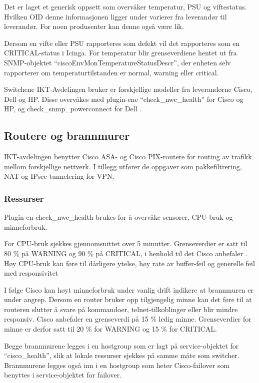 Det er laget et generisk oppsett som overvåker temperatur, PSU og viftestatus. Hvilken OID denne informasjonen ligger under varierer fra leverandør til leverandør. For noen produsenter kan denne også være lik. 

Dersom en vifte eller PSU rapporteres som defekt vil det rapporteres som en CRITICAL-status i Icinga. For temperatur blir grenseverdiene hentet ut fra SNMP-objektet ``ciscoEnvMonTemperatureStatusDescr'', der enheten selv rapporterer om temperaturtilstanden er normal, warning eller critical\cite{cisco_env_mib}.

Switchene IKT-Avdelingen bruker er forskjellige modeller fra leverandørne Cisco, Dell og HP. Disse overvåkes med plugin-ene ``check\_nwc\_health'' \cite{checknwc} for Cisco og HP, og check\_snmp\_powerconnect for Dell \cite{checkpowerconnect}.

\subsection{Routere og brannmurer}
IKT-avdelingen benytter Cisco ASA- og Cisco PIX-routere for routing av trafikk mellom forskjellige nettverk. I tillegg utfører de oppgaver som pakkefiltrering, NAT og IPsec-tunnelering for VPN.

\subsubsection{Ressurser}
Plugin-en check\_nwc\_health brukes for å overvåke sensorer, CPU-bruk og minneforbruk.

For CPU-bruk sjekkes gjennomsnittet over 5 minutter. Grenseverdier er satt til 80 \% på WARNING og 90 \% på CRITICAL, i henhold til det Cisco anbefaler \cite{ciscounifiedcommunication}. Høy CPU-bruk kan føre til dårligere ytelse, høy rate av buffer-feil og generelle feil med responsivitet \cite{ciscocpurouters}

I følge Cisco kan høyt minneforbruk under vanlig drift indikere at brannmuren er under angrep\cite{ciscomem}. Dersom en router bruker opp tilgjengelig minne kan det føre til at routeren slutter å svare på kommandoer, telnet-tilkoblinger eller blir mindre responsiv\cite{ciscomemproblem}. Cisco anbefaler en grenseverdi på 15 \% ledig minne\cite{ciscounifiedcommunication}. Grenseverdier for minne er derfor satt til 20 \% for WARNING og 15 \% for CRITICAL.

Begge brannmurene legges i en hostgroup som er lagt på service-objektet for ``cisco\_health'', slik at lokale ressurser sjekkes på samme måte som switcher. Brannmurene legges også inn i en hostgroup som heter Cisco-failover som benyttes i service-objektet for failover.

